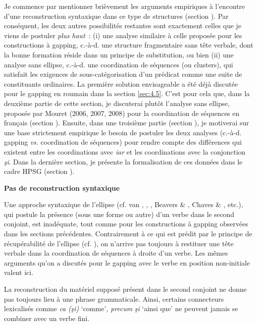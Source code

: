 Je commence par mentionner brièvement les arguments empiriques à l'encontre d'une reconstruction syntaxique dans ce type de structures (section ). Par conséquent, les deux autres possibilités restantes sont exactement celles que je viens de postuler \textit{plus haut~}: (i) une analyse similaire à celle proposée pour les constructions à gapping, c.-à-d. une structure fragmentaire sans tête verbale, dont la bonne formation réside dans un principe de substitution, ou bien (ii) une analyse sans ellipse, c.-à-d. une coordination de séquences (ou clusters), qui satisfait les exigences de sous-catégorisation d'un prédicat comme une suite de constituants ordinaires. La première solution envisageable a été déjà discutée pour le gapping en roumain dans la section \ref{sec:4.5}. C'est pour cela que, dans la deuxième partie de cette section, je discuterai plutôt l'analyse sans ellipse, proposée par Mouret (2006, 2007, 2008) pour la coordination de séquences en français (section ). Ensuite, dans une troisième partie (section ), je motiverai sur une base strictement empirique le besoin de postuler les deux analyses (c.-à-d. gapping \textit{vs.} coordination de séquences) pour rendre compte des différences qui existent entre les coordinations avec \textit{iar} et les coordinations avec la conjonction \textit{şi}. Dans la dernière section, je présente la formalisation de ces données dans le cadre HPSG (section ).  

{\bfseries
\label{bkm:Ref302392620}Pas de reconstruction syntaxique}

Une approche syntaxique de l'ellipse (cf. van \citet{Oirsouw1987}, \citet{Wilder1997}, \citet{Crysmann2003}, Beavers \& \citet{Sag2004}, Chaves \& \citet{Sag2008}, etc.), qui postule la présence (sous une forme ou autre) d'un verbe dans le second conjoint, est inadéquate, tout comme pour les constructions à gapping observées dans les sections précédentes. Contrairement à ce qui est prédit par le principe de récupérabilité de l'ellipse (cf. \citet{Chomsky1964}), on n'arrive pas toujours à restituer une tête verbale dans la coordination de séquences à droite d'un verbe. Les mêmes arguments qu'on a discutés pour le gapping avec le verbe en position non-initiale valent ici. 

La reconstruction du matériel supposé présent dans le second conjoint ne donne pas toujours lieu à une phrase grammaticale. Ainsi, certains connecteurs lexicalisés comme \textit{ca (şi)} `comme'\textit{, precum şi} `ainsi que' ne peuvent jamais se combiner avec un verbe fini.


